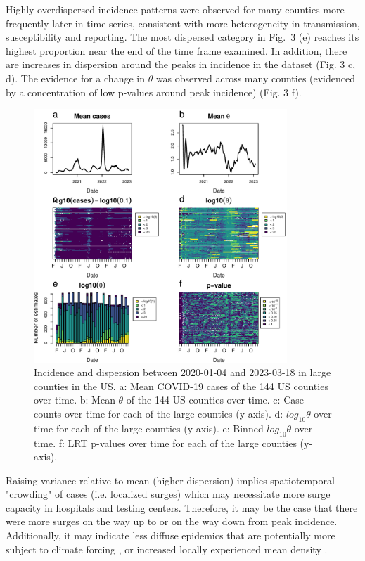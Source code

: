 \documentclass[10pt,letterpaper]{article}
\begin{document}
Highly overdispersed incidence patterns were observed for many counties more frequently later in time series, consistent with more heterogeneity in transmission, susceptibility and reporting. 
The most dispersed category in Fig.\ 3 (e) reaches its highest proportion near the end of the time frame examined.
In addition, there are increases in dispersion around the peaks in incidence in the dataset (Fig. 3 c, d).
The evidence for a change in \begin{math}\theta\end{math} was observed across many counties (evidenced by a concentration of low p-values around peak incidence) (Fig. 3 f).

\begin{figure}[!h]
\centering
\includegraphics[width=0.85\textwidth]{fig3.pdf}
\caption{
Incidence and dispersion between 2020-01-04 and 2023-03-18 in large counties in the US. a: Mean COVID-19 cases of the 144 US counties over time. b: Mean $\theta$ of the 144 US counties over time. c: Case counts over time for each of the large counties (y-axis). d: $log_{10}\theta$ over time for each of the large counties (y-axis). e: Binned $log_{10}\theta$ over time. f: LRT p-values over time for each of the large counties (y-axis).
}
\label{fig3}
\end{figure}

Raising variance relative to mean (higher dispersion) implies spatiotemporal "crowding" of cases (i.e. localized surges) which may necessitate more surge capacity in hospitals and testing centers. Therefore, it may be the case that there were more surges on the way up to or on the way down from peak incidence. 
Additionally, it may indicate less diffuse epidemics that are potentially more subject to climate forcing \cite{dalziel_urbanization_2018}, or increased locally experienced mean density \cite{lloyd_mean_1967}. 
\end{document}
